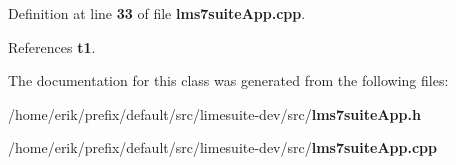 Definition at line {\bf 33} of file {\bf lms7suite\+App.\+cpp}.



References {\bf t1}.



The documentation for this class was generated from the following files\+:\begin{DoxyCompactItemize}
\item 
/home/erik/prefix/default/src/limesuite-\/dev/src/{\bf lms7suite\+App.\+h}\item 
/home/erik/prefix/default/src/limesuite-\/dev/src/{\bf lms7suite\+App.\+cpp}\end{DoxyCompactItemize}

